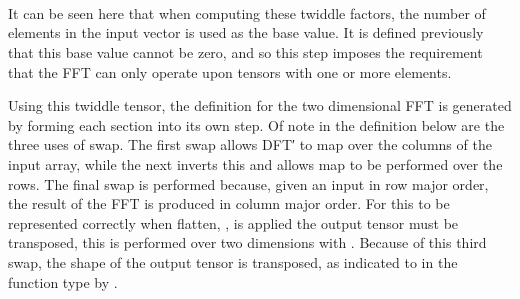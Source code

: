 \begin{code}[hide]%
\>[2][@{}l@{\AgdaIndent{1}}]%
\>[6]\<%
\\
\>[6][@{}l@{\AgdaIndent{0}}]%
\>[8]\<%
\\
\>[8][@{}l@{\AgdaIndent{0}}]%
\>[10]\<%
\\
\>[10][@{}l@{\AgdaIndent{0}}]%
\>[12]\AgdaSymbol{\AgdaUnderscore{}}\AgdaSpace{}%
\AgdaSymbol{:}\AgdaSpace{}%
\AgdaSpace{}%
\AgdaSymbol{(}\AgdaSpace{}%
\AgdaSpace{}%
\AgdaSymbol{)}\<%
\end{code}

It can be seen here that when computing these twiddle factors, the number of 
elements in the input vector is used as the base value.
It is defined previously that this base value cannot be zero, and so this 
step imposes the requirement that the FFT can only operate upon tensors with one or more elements.

Using this twiddle tensor, the definition for the two dimensional FFT is generated
by forming each section into its own step.
Of note in the definition below are the three uses of swap.
The first swap allows DFT′ to map over the columns of the input array,
while the next inverts this and allows map to be performed over the rows.
The final swap is performed because, given an input in row major order, the 
result of the FFT is produced in column major order. 
For this to be represented correctly when flatten, , is applied the output
tensor must be transposed, this is performed over two dimensions with .
Because of this third swap, the shape of the output tensor is transposed, as
indicated to in the function type by .

